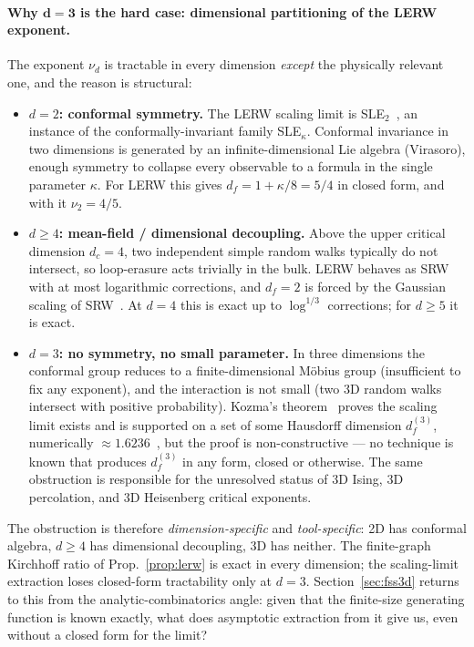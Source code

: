\documentclass[10pt,a4paper,twocolumn]{article}
\theoremstyle{plain}
\theoremstyle{definition}
\begin{document}
\paragraph{Why $\boldsymbol{d = 3}$ is the hard case: dimensional
partitioning of the LERW exponent.}
The exponent $\nu_d$ is tractable in every dimension \emph{except}
the physically relevant one, and the reason is structural:
\begin{itemize}[leftmargin=*]
\item \textbf{$d = 2$: conformal symmetry.}  The LERW scaling limit
  is SLE$_2$~\citep{LawlerSchrammWerner2004}, an instance of the
  conformally-invariant family SLE$_\kappa$.  Conformal invariance
  in two dimensions is generated by an infinite-dimensional Lie
  algebra (Virasoro), enough symmetry to collapse every observable
  to a formula in the single parameter $\kappa$.  For LERW this
  gives $d_f = 1 + \kappa / 8 = 5/4$ in closed form, and with it
  $\nu_2 = 4/5$.

\item \textbf{$d \geq 4$: mean-field / dimensional decoupling.}
  Above the upper critical dimension $d_c = 4$, two independent
  simple random walks typically do not intersect, so loop-erasure
  acts trivially in the bulk.  LERW behaves as SRW with at most
  logarithmic corrections, and $d_f = 2$ is forced by the Gaussian
  scaling of SRW~\citep{Lawler1986}.  At $d = 4$ this is exact up
  to $\log^{1/3}$ corrections; for $d \geq 5$ it is exact.

\item \textbf{$d = 3$: no symmetry, no small parameter.}  In three
  dimensions the conformal group reduces to a finite-dimensional
  M\"obius group (insufficient to fix any exponent), and the
  interaction is not small (two 3D random walks intersect with
  positive probability).  Kozma's theorem~\citep{Kozma2007} proves
  the scaling limit exists and is supported on a set of some
  Hausdorff dimension $d_f^{(3)}$, numerically
  $\approx 1.6236$~\citep{Wilson2010}, but the proof is
  non-constructive --- no technique is known that produces
  $d_f^{(3)}$ in any form, closed or otherwise.  The same
  obstruction is responsible for the unresolved status of 3D
  Ising, 3D percolation, and 3D Heisenberg critical exponents.
\end{itemize}

The obstruction is therefore \emph{dimension-specific} and
\emph{tool-specific}: 2D has conformal algebra, $d \geq 4$ has
dimensional decoupling, 3D has neither.  The finite-graph
Kirchhoff ratio of Prop.~\ref{prop:lerw} is exact in every
dimension; the scaling-limit extraction loses closed-form
tractability only at $d = 3$.  Section~\ref{sec:fss3d} returns
to this from the analytic-combinatorics angle: given that the
finite-size generating function is known exactly, what does
asymptotic extraction from it give us, even without a closed
form for the limit?
\end{document}
